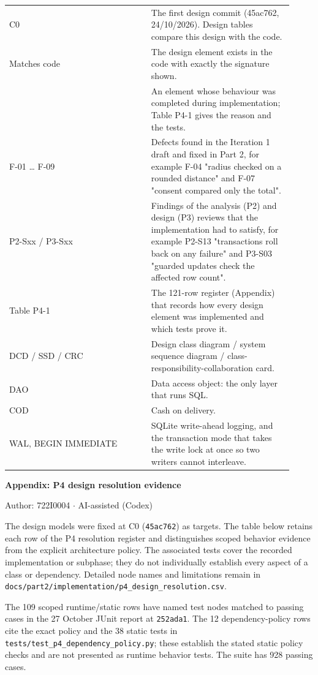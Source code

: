 \begin{longtable}{>{\raggedright\arraybackslash}p{0.4600\linewidth}>{\raggedright\arraybackslash}p{0.4600\linewidth}}
C0 & The first design commit (45ac762, 24/10/2026). Design tables compare this design with the code. \\
Matches code & The design element exists in the code with exactly the signature shown. \\
\textdagger{} & An element whose behaviour was completed during implementation; Table P4-1 gives the reason and the tests. \\
F-01 \ldots{} F-09 & Defects found in the Iteration 1 draft and fixed in Part 2, for example F-04 "radius checked on a rounded distance" and F-07 "consent compared only the total". \\
P2-Sxx / P3-Sxx & Findings of the analysis (P2) and design (P3) reviews that the implementation had to satisfy, for example P2-S13 "transactions roll back on any failure" and P3-S03 "guarded updates check the affected row count". \\
Table P4-1 & The 121-row register (Appendix) that records how every design element was implemented and which tests prove it. \\
DCD / SSD / CRC & Design class diagram / system sequence diagram / class-responsibility-collaboration card. \\
DAO & Data access object: the only layer that runs SQL. \\
COD & Cash on delivery. \\
WAL, BEGIN IMMEDIATE & SQLite write-ahead logging, and the transaction mode that takes the write lock at once so two writers cannot interleave. \\
\end{longtable}
\textbf{Appendix: P4 design resolution evidence}

Author: 722I0004 \ensuremath{\cdot} AI-assisted (Codex)

The design models were fixed at C0 (\texttt{45ac762}) as targets. The table below retains each row of the P4 resolution register and distinguishes scoped behavior evidence from the explicit architecture policy. The associated tests cover the recorded implementation or subphase; they do not individually establish every aspect of a class or dependency. Detailed node names and limitations remain in \texttt{docs/\allowbreak{}part2/\allowbreak{}implementation/\allowbreak{}p4\_\allowbreak{}design\_\allowbreak{}resolution.\allowbreak{}csv}.

The 109 scoped runtime/static rows have named test nodes matched to passing cases in the 27 October JUnit report at \texttt{252ada1}. The 12 dependency-policy rows cite the exact policy and the 38 static tests in \texttt{tests/\allowbreak{}test\_\allowbreak{}p4\_\allowbreak{}dependency\_\allowbreak{}policy.\allowbreak{}py}; these establish the stated static policy checks and are not presented as runtime behavior tests. The suite has 928 passing cases.


